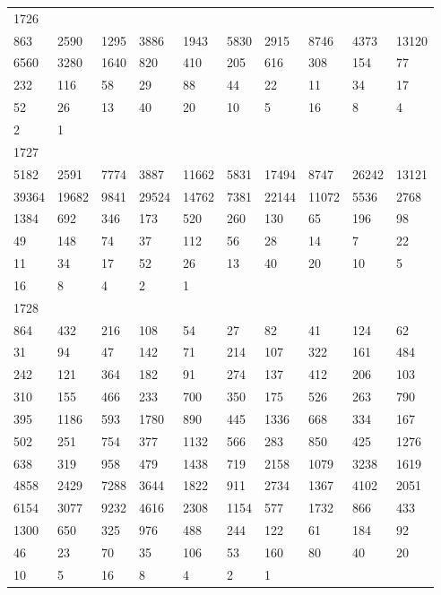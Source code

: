 \begin{longtable}{*{10}{l}}
1726&&&&&&&&&\\
863& 2590& 1295& 3886& 1943& 5830& 2915& 8746& 4373& 13120\\
6560& 3280& 1640& 820& 410& 205& 616& 308& 154& 77\\
232& 116& 58& 29& 88& 44& 22& 11& 34& 17\\
52& 26& 13& 40& 20& 10& 5& 16& 8& 4\\
2& 1& \\

1727&&&&&&&&&\\
5182& 2591& 7774& 3887& 11662& 5831& 17494& 8747& 26242& 13121\\
39364& 19682& 9841& 29524& 14762& 7381& 22144& 11072& 5536& 2768\\
1384& 692& 346& 173& 520& 260& 130& 65& 196& 98\\
49& 148& 74& 37& 112& 56& 28& 14& 7& 22\\
11& 34& 17& 52& 26& 13& 40& 20& 10& 5\\
16& 8& 4& 2& 1& \\

1728&&&&&&&&&\\
864& 432& 216& 108& 54& 27& 82& 41& 124& 62\\
31& 94& 47& 142& 71& 214& 107& 322& 161& 484\\
242& 121& 364& 182& 91& 274& 137& 412& 206& 103\\
310& 155& 466& 233& 700& 350& 175& 526& 263& 790\\
395& 1186& 593& 1780& 890& 445& 1336& 668& 334& 167\\
502& 251& 754& 377& 1132& 566& 283& 850& 425& 1276\\
638& 319& 958& 479& 1438& 719& 2158& 1079& 3238& 1619\\
4858& 2429& 7288& 3644& 1822& 911& 2734& 1367& 4102& 2051\\
6154& 3077& 9232& 4616& 2308& 1154& 577& 1732& 866& 433\\
1300& 650& 325& 976& 488& 244& 122& 61& 184& 92\\
46& 23& 70& 35& 106& 53& 160& 80& 40& 20\\
10& 5& 16& 8& 4& 2& 1& \\


\end{longtable}
